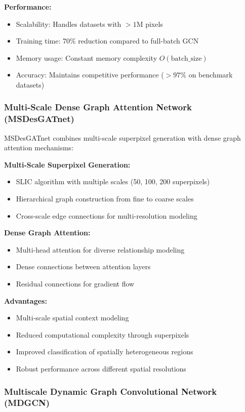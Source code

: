 \documentclass[journal]{IEEEtran}
\begin{document}
\textbf{Performance:}
\begin{itemize}
\item Scalability: Handles datasets with $>1$M pixels
\item Training time: 70\% reduction compared to full-batch GCN
\item Memory usage: Constant memory complexity $O(\text{batch\_size})$
\item Accuracy: Maintains competitive performance ($>97\%$ on benchmark datasets)
\end{itemize}

\subsubsection{Multi-Scale Dense Graph Attention Network (MSDesGATnet)}

MSDesGATnet combines multi-scale superpixel generation with dense graph attention mechanisms:

\textbf{Multi-Scale Superpixel Generation:}
\begin{itemize}
\item SLIC algorithm with multiple scales (50, 100, 200 superpixels)
\item Hierarchical graph construction from fine to coarse scales
\item Cross-scale edge connections for multi-resolution modeling
\end{itemize}

\textbf{Dense Graph Attention:}
\begin{itemize}
\item Multi-head attention for diverse relationship modeling
\item Dense connections between attention layers
\item Residual connections for gradient flow
\end{itemize}

\textbf{Advantages:}
\begin{itemize}
\item Multi-scale spatial context modeling
\item Reduced computational complexity through superpixels
\item Improved classification of spatially heterogeneous regions
\item Robust performance across different spatial resolutions
\end{itemize}

\subsubsection{Multiscale Dynamic Graph Convolutional Network (MDGCN)}
\end{document}

